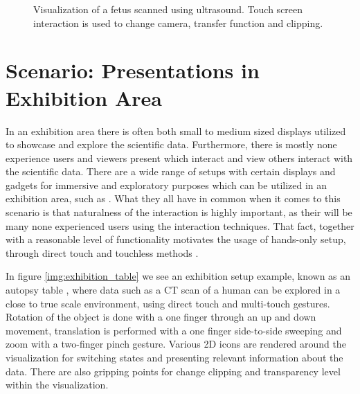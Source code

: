 \documentclass[review,journal]{vgtc}         %
\begin{document}
\begin{figure}[htb]
	\centering
	\caption{Visualization of a fetus scanned using ultrasound. Touch screen interaction is used to change camera, transfer function and clipping.}
	\label{img:touch_workstation}
\end{figure}

\section{Scenario: Presentations in Exhibition Area}

In an exhibition area there is often both small to medium sized displays utilized to showcase and explore the scientific data.
Furthermore, there is mostly none experience users and viewers present which interact and view others interact with the scientific data.
There are a wide range of setups with certain displays and gadgets for immersive and exploratory purposes which can be utilized in an exhibition area, such as \cite{Laha:2013:VCB:2491367.2491368, conf/egve/KruszynskiL08}.
What they all have in common when it comes to this scenario is that naturalness of the interaction is highly important, as their will be many none experienced users using the interaction techniques.
That fact, together with a reasonable level of functionality motivates the usage of hands-only setup, through direct touch \cite{Klein:2012:DSD:2322389.2322403} and touchless methods \cite{O'hara:2013:NTP:2442106.2442111}.

In figure \ref{img:exhibition_table} we see an exhibition setup example, known as an autopsy table \cite{LRFPY11}, where data such as a CT scan of a human can be explored in a close to true scale environment, using direct touch and multi-touch gestures.
Rotation of the object is done with a one finger through an up and down movement, translation is performed with a one finger side-to-side sweeping and zoom with a two-finger pinch gesture.
Various 2D icons are rendered around the visualization for switching states and presenting relevant information about the data.
There are also gripping points for change clipping and transparency level within the visualization.
\end{document}
